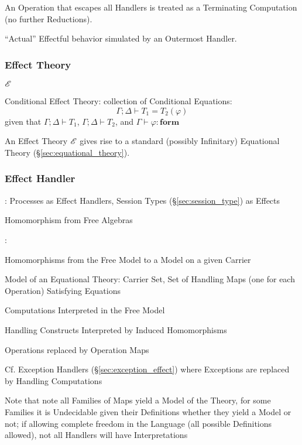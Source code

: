 An Operation that escapes all Handlers is treated as a Terminating
Computation (no further Reductions). \cite{pretnar15}

``Actual'' Effectful behavior simulated by an Outermost Handler.
\cite{pretnar15}



\subsubsection{Effect Theory}\label{sec:effect_theory}
\cite{plotkin-pretnar09}

$\mathscr{E}$

Conditional Effect Theory: collection of Conditional Equations:
\[
  \Gamma; \Delta \vdash T_1 = T_2(\varphi)
\]
given that $\Gamma; \Delta \vdash T_1$, $\Gamma; \Delta \vdash T_2$,
and $\Gamma \vdash \varphi : \mathbf{form}$

An Effect Theory $\mathscr{E}$ gives rise to a standard (possibly
Infinitary) Equational Theory (\S\ref{sec:equational_theory}).
\cite{plotkin-pretnar09}



\subsubsection{Effect Handler}\label{sec:effect_handler}

\cite{orchard-yoshida16}: Processes as Effect Handlers, Session Types
(\S\ref{sec:session_type}) as Effects

Homomorphism from Free Algebras
\cite{bauer-pretnar12}

\cite{plotkin-pretnar13}:

Homomorphisms from the Free Model to a Model on a given Carrier

Model of an Equational Theory: Carrier Set, Set of Handling Maps (one
for each Operation) Satisfying Equations

Computations Interpreted in the Free Model

Handling Constructs Interpreted by Induced Homomorphisms

Operations replaced by Operation Maps

\fist Cf. Exception Handlers (\S\ref{sec:exception_effect}) where
Exceptions are replaced by Handling Computations

\danger\; Note that note all Families of Maps yield a Model of the
Theory, for some Families it is Undecidable given their Definitions
whether they yield a Model or not; if allowing complete freedom in the
Language (all possible Definitions allowed), not all Handlers will
have Interpretations


